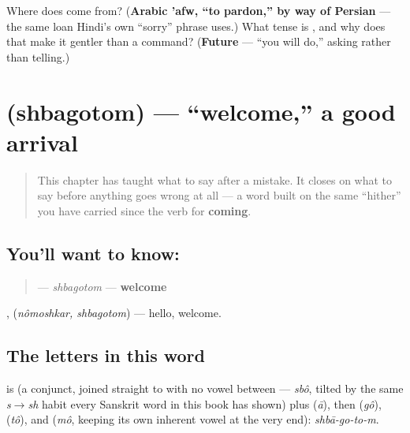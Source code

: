\begin{tcolorbox}[breakable,colback=teal!4,colframe=teal!35!black,title={Before you move on}]
Where does  come from? (\textbf{Arabic 'afw, \textquotedblleft{}to pardon,\textquotedblright{} by way of Persian} — the same loan Hindi's own \textquotedblleft{}sorry\textquotedblright{} phrase uses.) What tense is , and why does that make it gentler than a command? (\textbf{Future} — \textquotedblleft{}you will do,\textquotedblright{} asking rather than telling.)
\end{tcolorbox}
\section[\texorpdfstring{\bn{স্বাগতম} (shbagotom)}{স্বাগতম (shbagotom)}]{ (shbagotom) — \textquotedblleft{}welcome,\textquotedblright{} a good arrival}

\label{lesson:BN-C13-sbagotom}



\begin{quote}
This chapter has taught what to say after a mistake. It closes on what to say before anything goes wrong at all — a word built on the same \textquotedblleft{}hither\textquotedblright{} you have carried since the verb for \textbf{coming}.
\end{quote}

\subsection*{You'll want to know: }
\begin{quote}
\textbf{} — \emph{shbagotom} — \textbf{welcome}
\end{quote}

,  (\emph{nômoshkar, shbagotom}) — hello, welcome.

\subsection*{The letters in this word}
\textbf{} is \textbf{} (a conjunct,  joined straight to  with no vowel between — \emph{sbô}, tilted by the same \emph{s$\to$sh} habit every Sanskrit word in this book has shown) plus \textbf{} (\emph{ā}), then \textbf{} (\emph{gô}), \textbf{} (\emph{tô}), and \textbf{} (\emph{mô}, keeping its own inherent vowel at the very end): \emph{shbā-go-to-m}.

